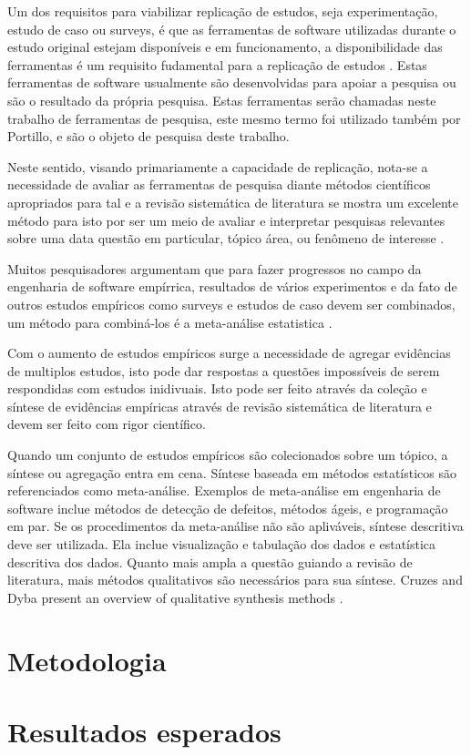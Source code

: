 \documentclass[12pt]{article}
\begin{document}
Um dos requisitos para viabilizar replicação de estudos, seja experimentação,
estudo de caso ou surveys, é que as ferramentas de software utilizadas durante
o estudo original estejam disponíveis e em funcionamento, a disponibilidade
das ferramentas é um requisito fudamental para a replicação de estudos
\cite{Kon11}. Estas ferramentas de software usualmente são desenvolvidas para
apoiar a pesquisa ou são o resultado da própria pesquisa. Estas ferramentas
serão chamadas neste trabalho de ferramentas de pesquisa, este mesmo termo foi
utilizado também por Portillo\cite{Portillo12}, e são o objeto de pesquisa
deste trabalho.

Neste sentido, visando primariamente a capacidade de replicação, nota-se a
necessidade de avaliar as ferramentas de pesquisa diante métodos científicos
apropriados para tal e a revisão sistemática de literatura se mostra um
excelente método para isto por ser um meio de avaliar e interpretar pesquisas
relevantes sobre uma data questão em particular, tópico área, ou fenômeno de
interesse \cite{Kitchenham2006}.

Muitos pesquisadores argumentam que para fazer progressos no campo da
engenharia de software empírrica, resultados de vários experimentos e da fato
de outros estudos empíricos como surveys e estudos de caso devem ser
combinados, um método para combiná-los é a meta-análise estatistica
\cite{Almqvist2006}.

Com o aumento de estudos empíricos surge a necessidade de agregar evidências
de multiplos estudos, isto pode dar respostas a questões impossíveis de serem
respondidas com estudos inidivuais. Isto pode ser feito através da coleção e
síntese de evidências empíricas através de revisão sistemática de literatura e
devem ser feito com rigor científico.

Quando um conjunto de estudos empíricos são colecionados sobre um tópico, a
síntese ou agregação entra em cena. Síntese baseada em métodos estatísticos
são referenciados como meta-análise. Exemplos de meta-análise em engenharia de
software inclue métodos de detecção de defeitos, métodos ágeis, e programação
em par. Se os procedimentos da meta-análise não são apliváveis, síntese
descritiva deve ser utilizada. Ela inclue visualização e tabulação dos dados e
estatística descritiva dos dados. Quanto mais ampla a questão guiando a
revisão de literatura, mais métodos qualitativos são necessários para sua
síntese.  Cruzes and Dyba present an overview of qualitative synthesis methods
\cite{Cruzes11}.

\section{Metodologia}

\section{Resultados esperados}


\end{document}
